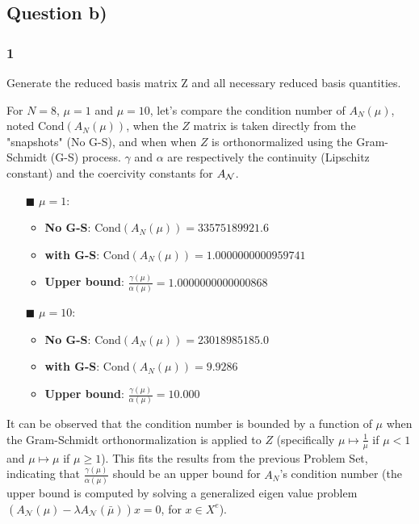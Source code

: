 \documentclass[
	english,
	11pt, %
]{fphw}
\begin{document}



\subsection*{Question b)}
\subsubsection*{1}
\begin{problem}
	Generate the reduced basis matrix Z and all necessary reduced basis quantities.
\end{problem}


For $N=8$, $\mu=1$ and $\mu = 10$, let's compare the condition number of $A_N(\mu)$, noted $\text{Cond}(A_N(\mu))$, when the $Z$ matrix is taken directly from the "snapshots" (No G-S), and when when $Z$ is orthonormalized using the Gram-Schmidt (G-S) process. $\gamma$ and $\alpha$ are respectively the continuity (Lipschitz constant) and the coercivity constants for $A_{\cal{N}}$.
\begin{itemize}
	\item[$\blacksquare$] $\mu=1$:
	\begin{itemize}
		\item \textbf{No G-S}: $\text{Cond}(A_N(\mu)) = 33575189921.6$
		\item \textbf{with G-S}: $\text{Cond}(A_N(\mu)) = 1.0000000000959741$
		\item \textbf{Upper bound}: $\frac{\gamma(\mu)}{\alpha(\mu)} = 1.0000000000000868$
	\end{itemize} 
	\item[$\blacksquare$] $\mu=10$:
	\begin{itemize}
		\item \textbf{No G-S}: $\text{Cond}(A_N(\mu)) = 23018985185.0$
		\item \textbf{with G-S}: $\text{Cond}(A_N(\mu)) = 9.9286$
		\item \textbf{Upper bound}: $\frac{\gamma(\mu)}{\alpha(\mu)} = 10.000$
	\end{itemize} 
\end{itemize}
It can be observed that the condition number is bounded by a function of $\mu$ when the Gram-Schmidt orthonormalization is applied to $Z$ (specifically $\mu \mapsto \frac{1}{\mu}$ if $\mu<1$ and $\mu \mapsto \mu$ if $\mu \geq1$). This fits the results from the previous Problem Set, indicating that $\frac{\gamma(\mu)}{\alpha(\mu)}$ should be an upper bound for $A_N$'s condition number (the upper bound is computed by solving a generalized eigen value problem $ \left(A_{\mathcal{N}}(\mu)-\lambda A_{\mathcal{N}}(\bar{\mu})\right)x = 0$, for $x\in X^e$).  
\end{document}

